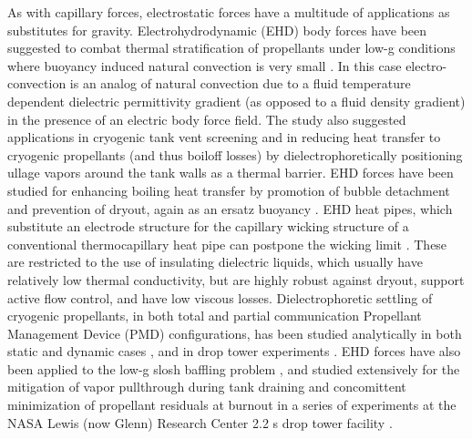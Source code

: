 \documentclass[12pt,a4paper,oneside]{book}
\begin{document}
As with capillary forces, electrostatic forces have a multitude of applications as substitutes for gravity. Electrohydrodynamic (EHD) body forces have been suggested to combat thermal stratification of propellants under low-g conditions where buoyancy induced natural convection is very small \cite{blackmon_collection_1965}. In this case electro-convection is an analog of natural convection due to a fluid temperature dependent dielectric permittivity gradient (as opposed to a fluid density gradient) in the presence of an electric body force field. The study also suggested applications in cryogenic tank vent screening and in reducing heat transfer to cryogenic propellants (and thus boiloff losses) by dielectrophoretically positioning ullage vapors around the tank walls as a thermal barrier. EHD forces have been studied for enhancing boiling heat transfer by promotion of bubble detachment and prevention of dryout, again as an ersatz buoyancy \cite{snyder_dielectrophoresis_2001, di_marco_influence_2003, marco_use_2012}. EHD heat pipes, which substitute an electrode structure for the capillary wicking structure of a conventional thermocapillary heat pipe can postpone the wicking limit \cite{jones_electrohydrodynamic_1973}. These are restricted to the use of insulating dielectric liquids, which usually have relatively low thermal conductivity, but are highly robust against dryout, support active flow control, and have low viscous losses. Dielectrophoretic settling of cryogenic propellants, in both total and partial communication Propellant Management Device (PMD) configurations, has been studied analytically in both static \cite{hurwitz_electrohydrodynamic_1966} and dynamic cases \cite{koval_dynamics_1967}, and in drop tower experiments \cite{fax_dielectrophoretic_1969}. EHD forces have also been applied to the low-g slosh baffling problem \cite{boretz_orbital_1970, petrash_use_1968, hurwitz_dielectrophoretic_1968}, and studied extensively for the mitigation of vapor pullthrough during tank draining and concomittent minimization of propellant residuals at burnout in a series of experiments at the NASA Lewis (now Glenn) Research Center 2.2 s drop tower facility \cite{berenyi_dielectrophoretic_1970}. 
\end{document}
